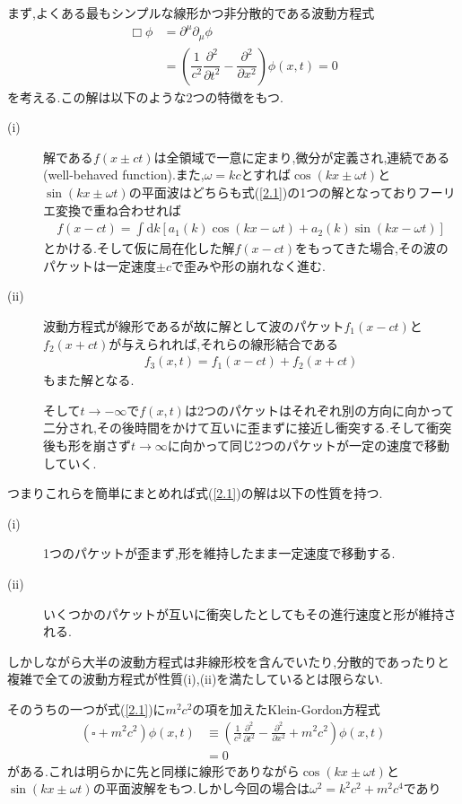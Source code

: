 \documentclass[dvipdfmx,11pt,a4paper]{jsbook}
\begin{document}
まず,よくある最もシンプルな線形かつ非分散的である波動方程式
\begin{align}
    \Box\phi & =\partial^{\mu}\partial_{\mu}\phi\nonumber                                                                          \\
             & =\left(\dfrac{1}{c^2}\dfrac{\partial^2}{\partial t^2}-\dfrac{\partial^2}{\partial x^2}\right)\phi(x,t)=0\label{2.1}
\end{align}
を考える.この解は以下のような2つの特徴をもつ.
\begin{description}
    \item[(i)] 解である$f(x\pm ct)$は全領域で一意に定まり,微分が定義され,連続である(well-behaved function).また,$\omega=kc$とすれば$\cos(kx\pm \omega t)$と$\sin(kx\pm \omega t)$の平面波はどちらも式(\ref{2.1})の1つの解となっておりフーリエ変換で重ね合わせれば
          \begin{align}
              f(x-c t)=\int \mathrm{d} k\left[a_{1}(k) \cos (k x-\omega t)+a_{2}(k) \sin (k x-\omega t)\right]
          \end{align}
          とかける.そして仮に局在化した解$f(x-ct)$をもってきた場合,その波のパケットは一定速度$\pm c$で歪みや形の崩れなく進む.
    \item[(ii)] 波動方程式が線形であるが故に解として波のパケット$f_1(x-ct)$と$f_2(x+ct)$が与えられれば,それらの線形結合である
          \begin{align}
              f_3(x,t)=f_1(x-ct)+f_2(x+ct)
          \end{align}
          もまた解となる.

          そして$t\rightarrow-\infty$で$f(x,t)$は2つのパケットはそれぞれ別の方向に向かって二分され,その後時間をかけて互いに歪まずに接近し衝突する.そして衝突後も形を崩さず$t\rightarrow\infty$に向かって同じ2つのパケットが一定の速度で移動していく.
\end{description}
つまりこれらを簡単にまとめれば式(\ref{2.1})の解は以下の性質を持つ.
\begin{screen}
    \begin{description}
        \item[(i)] 1つのパケットが歪まず,形を維持したまま一定速度で移動する.
        \item[(ii)] いくつかのパケットが互いに衝突したとしてもその進行速度と形が維持される.
    \end{description}
\end{screen}
しかしながら大半の波動方程式は非線形校を含んでいたり,分散的であったりと複雑で全ての波動方程式が性質(i),(ii)を満たしているとは限らない.

そのうちの一つが式(\ref{2.1})に$m^2c^2$の項を加えたKlein-Gordon方程式
\begin{align}
    \left(\square+m^{2} c^{2}\right) \phi(x, t) & \equiv\left(\frac{1}{c^{2}} \frac{\partial^{2}}{\partial t^{2}}-\frac{\partial^{2}}{\partial x^{2}}+m^{2} c^{2}\right) \phi(x, t) \\
                                                & =0
\end{align}
がある.これは明らかに先と同様に線形でありながら$\cos(kx\pm \omega t)$と$\sin(kx\pm \omega t)$の平面波解をもつ.しかし今回の場合は$\omega^2=k^2c^2+m^2c^4$であり
\end{document}
